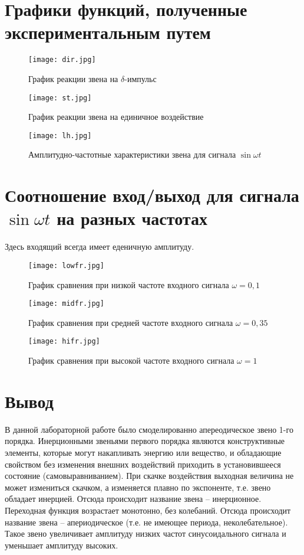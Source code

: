 \section{Графики функций, полученные экспериментальным путем}
\begin{figure}[h!]
		\centering
		\texttt{[image: dir.jpg]}
		\caption{График реакции звена на $\delta$-импульс}
\end{figure}
\begin{figure}[h!]
		\centering
		\texttt{[image: st.jpg]}
		\caption{График реакции звена на единичное воздействие}
\end{figure}
\begin{figure}[h!]
		\centering
		\texttt{[image: lh.jpg]}
		\caption{Амплитудно-частотные характеристики звена для сигнала $\sin\omega{}t$}
\end{figure}

\pagebreak
\section{Соотношение вход/выход для сигнала $\sin\omega{}t$ на разных частотах}
Здесь входящий всегда имеет еденичную амплитуду.
\begin{figure}[h!]
		\centering
		\texttt{[image: lowfr.jpg]}
		\caption{График сравнения при низкой частоте входного сигнала $\omega=0{,}1$}
\end{figure}
\begin{figure}[h!]
		\centering
		\texttt{[image: midfr.jpg]}
		\caption{График сравнения при средней частоте входного сигнала $\omega=0{,}35$}
\end{figure}
\begin{figure}[h!]
		\centering
		\texttt{[image: hifr.jpg]}
		\caption{График сравнения при высокой частоте входного сигнала $\omega=1$}
\end{figure}
\section{Вывод}
В данной лабораторной работе было смоделированно апереодическое звено 1-го порядка. Инерционными звеньями первого порядка являются конструктивные элементы, которые могут накапливать энергию или вещество, и обладающие свойством без изменения внешних воздействий приходить в установившееся состояние (самовыравниванием). При скачке воздействия выходная величина не может измениться скачком, а изменяется плавно по экспоненте, т.е. звено обладает инерцией. Отсюда происходит название звена – инерционное. Переходная функция возрастает монотонно, без колебаний. Отсюда происходит название звена – апериодическое (т.е. не имеющее периода, неколебательное). Такое звено увеличивает амплитуду низких частот синусоидального сигнала и уменьшает амплитуду высоких.